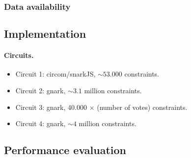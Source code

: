 

\subsubsection{Data availability}

\subsection{Implementation}
\label{sec:analysis:implementation}


\paragraph{Circuits.}
\begin{itemize}
	\item Circuit 1: circom/snarkJS, $\sim 53.000$ constraints.
	\item Circuit 2: gnark, $\sim 3.1$ million constraints.
	\item Circuit 3: gnark, 40.000 $\times$ (number of votes) constraints.
	\item Circuit 4: gnark, $\sim 4$ million constraints.
\end{itemize}

\subsection{Performance evaluation}
\label{sec:analysis:performance-evaluation}

